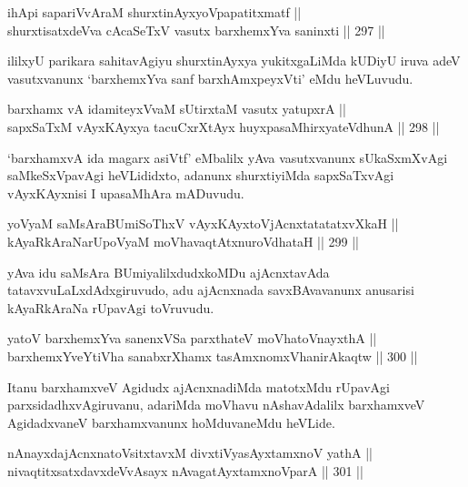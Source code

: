 \begin{shl}
ihApi sapariVvAraM shurxtinAyxyoVpapatitxmatf || \\
shurxtisatxdeVva cA\s \s caSeTxV vasutx barxhemxYva saninxti \hfill || 297 ||  
\end{shl}

\begin{artha}
ililxyU parikara sahitavAgiyu shurxtinAyxya yukitxgaLiMda kUDiyU iruva
adeV vasutxvanunx `barxhemxYva sanf barxhAmxpeyxVti' eMdu heVLuvudu.
\end{artha}

\begin{shl}
barxhamx vA idamiteyxVvaM sUtirxtaM vasutx yatupxrA || \\
sapxSaTxM vAyxKAyxya tacuCxrXtAyx huyxpasaMhirxyateV\s dhunA \hfill || 298 ||  
\end{shl}

\begin{artha}
`barxhamxvA ida magarx asiVtf' eMbalilx yAva vasutxvanunx sUkaSxmXvAgi
saMkeSxVpavAgi heVLididxto, adanunx shurxtiyiMda sapxSaTxvAgi\break
vAyxKAyxnisi I upasaMhAra mADuvudu.
\end{artha}


\begin{shl}
yoV\s yaM saMsAraBUmiSoThxV vAyxKAyxtoV\s jAcnxtatatatxvXkaH || \\
kAyaRkAraNarUpoV\s yaM moVhavaqtAtxnuroVdhataH \hfill || 299 ||  
\end{shl}

\begin{artha}
yAva idu saMsAra BUmiyalilxdudxkoMDu ajAcnxtavAda
tatavxvuLaLxdAdxgiruvudo, adu ajAcnxnada savxBAvavanunx anusarisi
kAyaRkAraNa rUpavAgi toVruvudu.
\end{artha}

\begin{shl}
yatoV barxhemxYva sanenxVSa parxthateV moVhatoV\s nayxthA || \\
barxhemxYveYtiVha sanabxrXhamx tasAmxnomxVhanirAkaqtw \hfill || 300 ||  
\end{shl}

\begin{artha}
Itanu barxhamxveV Agidudx ajAcnxnadiMda matotxMdu rUpavAgi
parxsidadhxvAgiruvanu, adariMda moVhavu nAshavAdalilx barxhamxveV
AgidadxvaneV barxhamxvanunx hoMduvaneMdu heVLide.
\end{artha}

\begin{shl}
nAnayxdajAcnxnatoV\s sitxtavxM divxtiVyasAyx\s \s tamxnoV yathA || \\
nivaqtitxsatxdavxdeVvAsayx nAvagatAyxtamxnoV\s parA \hfill || 301 ||  
\end{shl}

